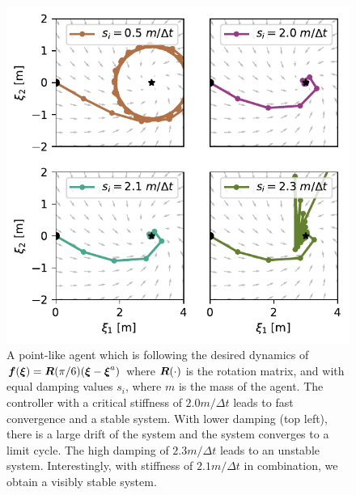 \begin{figure}[htb]
\centering
  \includegraphics[width=\columnwidth]{figures/discrete_controller_parameters_comparison_stable}
\caption{A point-like agent which is following the desired dynamics of
$\boldsymbol{f}(\boldsymbol{\xi}) = \boldsymbol{R}(\pi / 6) (\boldsymbol{\xi}  - \boldsymbol{\xi}^a)$ where $\boldsymbol{R}(\cdot)$ is the rotation matrix, and with equal damping values $s_i$, where $m$ is the mass of the agent.
The controller with a critical stiffness of $2.0 m / \Delta t$ leads to fast convergence and a stable system. With lower damping (top left), there is a large drift of the system and the system converges to a limit cycle. 
The high damping of $2.3 m / \Delta t$ leads to an unstable system. 
Interestingly, with stiffness of $2.1 m / \Delta t$ in combination, we obtain a visibly stable system.}
  \label{fig:discrete_controller_parameters_comparison_stable}
\end{figure}


% 
